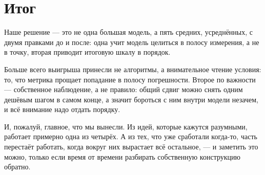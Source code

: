 \documentclass[11pt,a4paper]{article}
\begin{document}
\section{Итог}

Наше решение --- это не одна большая модель, а пять средних, усреднённых, с двумя правками
до и после: одна учит модель целиться в полосу измерения, а не в точку, вторая приводит
итоговую шкалу в порядок.

Больше всего выигрыша принесли не алгоритмы, а внимательное чтение условия: то, что метрика
прощает попадание в полосу погрешности. Второе по важности --- собственное наблюдение, а не
правило: общий сдвиг можно снять одним дешёвым шагом в самом конце, а значит бороться с ним
внутри модели незачем, и всё внимание надо отдать порядку.

И, пожалуй, главное, что мы вынесли. Из идей, которые кажутся разумными, работает примерно
одна из четырёх. А из тех, что уже сработали когда-то, часть перестаёт работать, когда вокруг
них вырастает всё остальное, --- и заметить это можно, только если время от времени разбирать
собственную конструкцию обратно.
\end{document}
